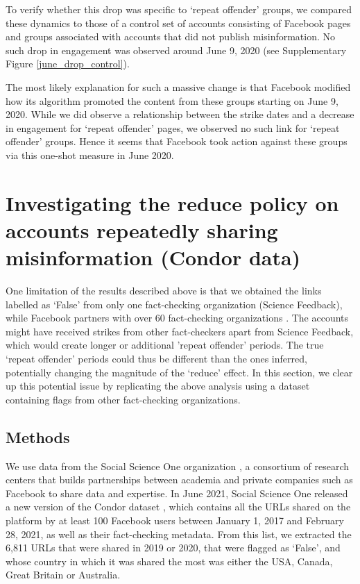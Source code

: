 \documentclass[review]{elsarticle}
\begin{document}
To verify whether this drop was specific to `repeat offender' groups, we compared these dynamics to those of a control set of accounts consisting of Facebook pages and groups associated with accounts that did not publish misinformation.
No such drop in engagement was observed around June 9, 2020 (see Supplementary Figure \ref{june_drop_control}).

The most likely explanation for such a massive change is that Facebook modified how its algorithm promoted the content from these groups starting on June 9, 2020.
While we did observe a relationship between the strike dates and a decrease in engagement for `repeat offender' pages, we observed no such link for `repeat offender' groups.
Hence it seems that Facebook took action against these groups via this one-shot measure in June 2020.

\section{Investigating the reduce policy on accounts repeatedly sharing misinformation (Condor data)}

One limitation of the results described above is that we obtained the links labelled as `False' from only one fact-checking organization (Science Feedback), while Facebook partners with over 60 fact-checking organizations \citep{60factCheckingPartners}.
The accounts might have received strikes from other fact-checkers apart from Science Feedback, which would create longer or additional 'repeat offender' periods. 
The true `repeat offender' periods could thus be different than the ones inferred, potentially changing the magnitude of the ‘reduce’ effect. 
In this section, we clear up this potential issue by replicating the above analysis using a dataset containing flags from other fact-checking organizations.

\subsection{Methods}

We use data from the Social Science One organization \cite{king2020new}, a consortium of research centers that builds partnerships between academia and private companies such as Facebook to share data and expertise.
In June 2021, Social Science One released a new version of the Condor dataset \cite{messing2020facebook}, which contains all the URLs shared on the platform by at least 100 Facebook users between January 1, 2017 and February 28, 2021, as well as their fact-checking metadata.
From this list, we extracted the 6,811 URLs that were shared in 2019 or 2020, that were flagged as `False', and whose country in which it was shared the most was either the USA, Canada, Great Britain or Australia.
\end{document}
